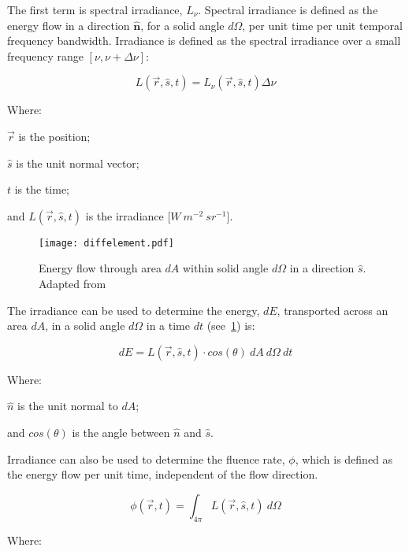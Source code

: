 The first term is spectral irradiance, $L_\nu$. Spectral irradiance is defined as the energy flow in a direction $\mathbf{\hat{n}}$, for a solid angle $d\Omega$, per unit time per unit temporal frequency bandwidth.	
Irradiance is defined as the spectral irradiance over a small frequency range $[\nu, \nu+\Delta \nu]$:

\begin{equation}
	L(\vec{r},\hat{s},t) = L_{\nu}(\vec{r},\hat{s},t)\Delta \nu	
\end{equation}

\noindent Where:

\indent $\vec{r}$ is the position;

\indent $\hat{s}$ is the unit normal vector;

\indent $t$ is the time;

\indent and $L(\vec{r},\hat{s},t)$ is the irradiance [$W\ m^{-2}\ sr^{-1}$].

\medskip

\begin{figure}[!htb]
	\centering
	\texttt{[image: diffelement.pdf]}
	\caption{Energy flow through area $dA$ within solid angle $d\Omega$ in a direction $\hat{s}$. Adapted from~\cite{wang2012biomedical,chandrasekhar2013radiative}}
	\label{fig:energydiag1}
\end{figure}

The irradiance can be used to determine the energy, $dE$, transported across an area $dA$, in a solid angle $d\Omega$ in a time $dt$ (see~\cref{fig:energydiag1}) is:

\begin{equation}
	dE = L(\vec{r},\hat{s},t) \cdot cos\left(\theta\right)\ dA\ d\Omega\ dt
\end{equation}

\noindent Where:

\indent $\hat{n}$ is the unit normal to $dA$;

\indent and $cos\left(\theta\right)$ is the angle between $\hat{n}$ and $\hat{s}$.

\medskip

Irradiance can also be used to determine the fluence rate, $\phi$, which is defined as the energy flow per unit time, independent of the flow direction.

\begin{equation}
	\phi(\vec{r},t)=\int_{4\pi}L(\vec{r},\hat{s},t)\ d\Omega
\end{equation}

\noindent Where:

